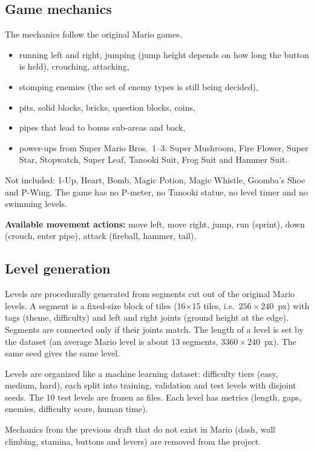 \documentclass[11pt,a4paper]{article}
\begin{document}
\subsection{Game mechanics}

The mechanics follow the original Mario games.

\begin{itemize}
  \item running left and right, jumping (jump height depends on how long the button is held),
        crouching, attacking,
  \item stomping enemies (the set of enemy types is still being decided),
  \item pits, solid blocks, bricks, question blocks, coins,
  \item pipes that lead to bonus sub-areas and back,
  \item power-ups from Super Mario Bros.\ 1--3: Super Mushroom, Fire Flower, Super Star,
        Stopwatch, Super Leaf, Tanooki Suit, Frog Suit and Hammer Suit.
\end{itemize}

Not included: 1-Up, Heart, Bomb, Magic Potion, Magic Whistle, Goomba's Shoe and P-Wing. The game has
no P-meter, no Tanooki statue, no level timer and no swimming levels.

\textbf{Available movement actions:} move left, move right, jump, run (sprint), down
(crouch, enter pipe), attack (fireball, hammer, tail).

\subsection{Level generation}

Levels are procedurally generated from segments cut out of the original Mario levels. A
segment is a fixed-size block of tiles (16$\times$15 tiles, i.e.\ $256\times240$~px) with
tags (theme, difficulty) and left and right joints (ground height at the edge). Segments are
connected only if their joints match. The length of a level is set by the dataset (an average
Mario level is about 13 segments, $3360\times240$~px). The same seed gives the same level.

Levels are organized like a machine learning dataset: difficulty tiers (easy, medium, hard),
each split into training, validation and test levels with disjoint seeds. The 10 test levels
are frozen as files. Each level has metrics (length, gaps, enemies, difficulty score, human
time).

Mechanics from the previous draft that do not exist in Mario (dash, wall climbing, stamina,
buttons and levers) are removed from the project.
\end{document}
